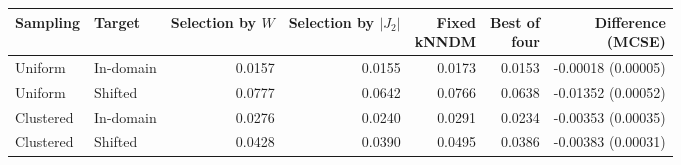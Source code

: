 \begin{tabular}{llrrrrr}
\toprule
Sampling & Target & \shortstack{Selection\\by $W$} & \shortstack{Selection\\by $|J_2|$} & \shortstack{Fixed\\kNNDM} & \shortstack{Best of\\four} & \shortstack{Difference\\(MCSE)} \\
\midrule
Uniform & In-domain & 0.0157 & 0.0155 & 0.0173 & 0.0153 & -0.00018 (0.00005) \\
Uniform & Shifted & 0.0777 & 0.0642 & 0.0766 & 0.0638 & -0.01352 (0.00052) \\
Clustered & In-domain & 0.0276 & 0.0240 & 0.0291 & 0.0234 & -0.00353 (0.00035) \\
Clustered & Shifted & 0.0428 & 0.0390 & 0.0495 & 0.0386 & -0.00383 (0.00031) \\
\bottomrule
\end{tabular}
